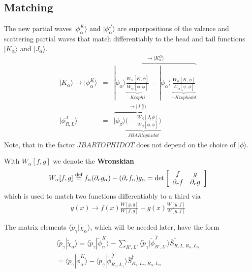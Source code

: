\documentclass[11pt,a4paper]{report}
\begin{document}
\subsection{Matching}
The new partial waves $|\phi^K_\alpha\rangle$ and
$|\phi^{\bar{J}}_\alpha\rangle$ are superpositions of the valence and
scattering partial waves that match differentiably to the head and
tail functions $|K_\alpha\rangle$ and $|J_\alpha\rangle$.
\begin{eqnarray}
|K_\alpha\rangle\rightarrow
|\phi^K_\alpha\rangle&=&
\overbrace{
|\phi_\alpha\rangle 
\underbrace{
\frac{W_\alpha[K,\dot{\phi}]}{W_\alpha[\phi,\dot{\phi}]}}_{Ktophi}
-\,|\dot{\phi}_\alpha\rangle 
\underbrace{\frac{W_\alpha[K,\phi]}{W_\alpha[\phi,\dot{\phi}]}}_{-Ktophidot}
}^{\rightarrow |K^\Omega_\alpha\rangle}
\nonumber\\
|\phi^{J}_{R,L}\rangle
&=&\overbrace{
|\dot{\phi}_\beta\rangle 
\underbrace{\biggl(-\frac{W_\beta[J,\phi]}{W_\beta[\phi,\dot{\phi}]}\biggr)}_{JBARtophidot}
}^{\rightarrow |J\;^\Omega_\beta\rangle}
\end{eqnarray}
Note, that in the factor $JBARTOPHIDOT$ does not depend on the choice
of $|\phi\rangle$.

With $W_\alpha[f,g]$ we denote the \textbf{Wronskian}
\begin{eqnarray}
W_\alpha[f,g]\stackrel{\text{def}}{=} f_\alpha (\partial_r g_\alpha)-(\partial_r f_\alpha)g_\alpha
=\det\left[\begin{array}{cc}f&g\\\partial_rf&\partial_rg\end{array}\right]
\end{eqnarray}
which is used to match two functions differentiably to a third via
\begin{eqnarray}
y(x)\rightarrow f(x)\frac{W[y,g]}{W[f,g]}+g(x)\frac{W[y,f]}{W[g,f]}
\end{eqnarray}


The matrix elements
$\langle\tilde{p}_\gamma|\tilde{\chi}_\alpha\rangle$, which will be
needed later, have the form
\begin{eqnarray}
\langle\tilde{p}_\gamma|\tilde{\chi}_\alpha\rangle
=\langle\tilde{p}_\gamma|\tilde{\phi}^K_\alpha\rangle
-\sum_{R',L'}\langle\tilde{p}_\gamma|\tilde{\phi}^{\bar{J}}_{R',L'}\rangle
\bar{S}^\dagger_{R,L,R_\alpha,L_\alpha}
\nonumber\\
=\langle\tilde{p}_\gamma|\tilde{\phi}^K_\alpha\rangle
-\langle\tilde{p}_\gamma|\tilde{\phi}^{\bar{J}}_{R_\gamma,L_\gamma}\rangle
\bar{S}^\dagger_{R_\gamma,L_\gamma,R_\alpha,L_\alpha}
\end{eqnarray}
\end{document}
